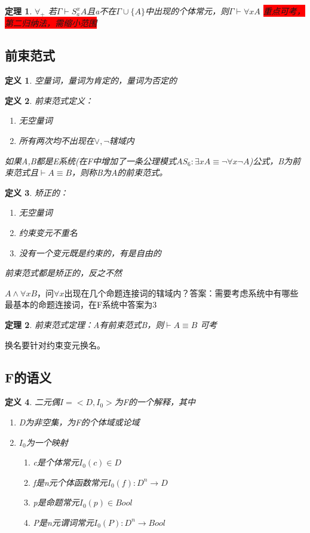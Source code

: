 \documentclass[a4paper]{ctexart}
\newtheorem{thm}{\hspace{2em}定理}[subsection]
\newtheorem{defi}{\hspace{2em}定义}[subsection]
\newcommand{\shade}[1]{\colorbox{shadecolor}{#1}}
\newcommand{\redshade}[1]{\colorbox{red}{#1}}
\begin{document}
\begin{thm}
  $\forall{}_+$ 若$\Gamma\vdash S_a^xA$且a不在$\Gamma\cup\{A\}$中出现的个体常元，则$\Gamma\vdash \forall{x}A$ \redshade{重点可考，第二归纳法，需缩小范围}
\end{thm}

\subsection{前束范式}

\begin{defi}
  空量词，量词为肯定的，量词为否定的
\end{defi}

\begin{defi}
  前束范式定义：
  \begin{enumerate}[itemindent=2em]
    \item 无空量词 
    \item 所有两次均不出现在$\vee,\neg$辖域内
  \end{enumerate}
  如果A,B都是E系统(在F中增加了一条公理模式$AS_6:\exists{x}A\equiv\neg\forall{x}\neg A$)公式，B为前束范式且$\vdash A\equiv B$，则称B为A的前束范式。
\end{defi}

\begin{defi}
  矫正的：
  \begin{enumerate}[itemindent=2em]
    \item 无空量词
    \item 约束变元不重名
    \item 没有一个变元既是约束的，有是自由的
  \end{enumerate}
  前束范式都是矫正的，反之不然
\end{defi}

$A\wedge\forall{x}B$，问$\forall{x}$出现在几个命题连接词的辖域内？答案：需要考虑系统中有哪些最基本的命题连接词，在F系统中答案为3

\begin{thm}
  前束范式定理：A有前束范式B，则$\vdash A\equiv B$ \shade{可考}
\end{thm}
换名要针对约束变元换名。

\subsection{F的语义}

\begin{defi}
  二元偶$I=<D,I_0>$为F的一个解释，其中
  \begin{enumerate}[itemindent=2em]
    \item D为非空集，为F的个体域或论域
    \item $I_0$为一个映射
      \begin{enumerate}
        \item c是个体常元$I_0(c)\in D$
        \item f是n元个体函数常元$I_0(f):D^n\rightarrow D$
        \item p是命题常元$I_0(p)\in Bool$
        \item P是n元谓词常元$I_0(P):D^n\rightarrow Bool$
      \end{enumerate}
  \end{enumerate}
\end{defi}
\end{document}
